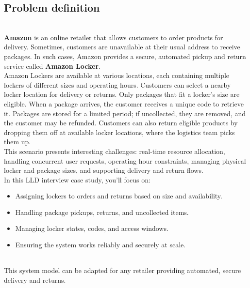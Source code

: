 

\subsection{Problem definition}\label{8t8osGei0gD63dyNYRfeL-1}
\\
\textbf{Amazon} is an online retailer that allows customers to order products for delivery. Sometimes, customers are unavailable at their usual address to receive packages. In such cases, Amazon provides a secure, automated pickup and return service called \textbf{Amazon Locker}.
\\
Amazon Lockers are available at various locations, each containing multiple lockers of different sizes and operating hours. Customers can select a nearby locker location for delivery or returns. Only packages that fit a locker's size are eligible. When a package arrives, the customer receives a unique code to retrieve it. Packages are stored for a limited period; if uncollected, they are removed, and the customer may be refunded. Customers can also return eligible products by dropping them off at available locker locations, where the logistics team picks them up.
\\
This scenario presents interesting challenges: real-time resource allocation, handling concurrent user requests, operating hour constraints, managing physical locker and package sizes, and supporting delivery and return flows.
\\
In this LLD interview case study, you'll focus on:

\begin{itemize}
\item
\protect{}\label{2EJBSmqU2syYVl9AenZbC}
Assigning lockers to orders and returns based on size and availability.
\item
\protect{}\label{00hrexJ79xVCs2zGAYH3P}
Handling package pickups, returns, and uncollected items.
\item
\protect{}\label{_RAu-Gb169EKU3Fz2Kqzq}
Managing locker states, codes, and access windows.
\item
\protect{}\label{xrZ7qnoD9HgqU7cYagVHj}
Ensuring the system works reliably and securely at scale.
\end{itemize}
\\
This system model can be adapted for any retailer providing automated, secure delivery and returns.


